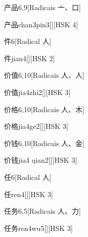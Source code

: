 \begin{entry}{产品}{6,9}[Radicais ⼇、⼝]
  \begin{phonetics}{产品}{chan3pin3}[][HSK 4]
  \end{phonetics}
\end{entry}

\begin{entry}{件}{6}[Radical ⼈]
  \begin{phonetics}{件}{jian4}[][HSK 2]
  \end{phonetics}
\end{entry}

\begin{entry}{价值}{6,10}[Radicais ⼈、⼈]
  \begin{phonetics}{价值}{jia4zhi2}[][HSK 3]
  \end{phonetics}
\end{entry}

\begin{entry}{价格}{6,10}[Radicais ⼈、⽊]
  \begin{phonetics}{价格}{jia4ge2}[][HSK 3]
  \end{phonetics}
\end{entry}

\begin{entry}{价钱}{6,10}[Radicais ⼈、⾦]
  \begin{phonetics}{价钱}{jia4 qian2}[][HSK 3]
  \end{phonetics}
\end{entry}

\begin{entry}{任}{6}[Radical ⼈]
  \begin{phonetics}{任}{ren4}[][HSK 3]
  \end{phonetics}
\end{entry}

\begin{entry}{任务}{6,5}[Radicais ⼈、⼒]
  \begin{phonetics}{任务}{ren4wu5}[][HSK 3]
  \end{phonetics}
\end{entry}

